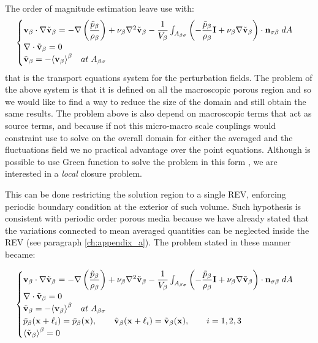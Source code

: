 The order of magnitude estimation leave use with:
\begin{eqnarray}
	\begin{cases}
		\textbf{v}_{\beta} \cdot \nabla \tilde{\textbf{v}}_{\beta} = -\nabla \left(\dfrac{\tilde{p}_{\beta}}{\rho_{\beta}}\right) + \nu_{\beta} \nabla^2 \tilde{\textbf{v}}_{\beta} - \dfrac{1}{V_\beta} \int_{A_{\beta \sigma}} \left(-\dfrac{\tilde{p}_{\beta}}{\rho_{\beta}} \mathbf{I}  + \nu_{\beta} \nabla \tilde{\textbf{v}}_{\beta} \right) \cdot \mathbf{n}_{\sigma \beta} \;dA  \\
		\nabla \cdot \tilde{\textbf{v}}_{\beta} = 0  \\
		\tilde{\textbf{v}}_{\beta} = -{\left< \textbf{v}_{\beta} \right>}^{\beta} \quad at \; A_{\beta \sigma}
	\end{cases}
\label{eq:vans_mom_}
\end{eqnarray}
that is the transport equations system for the perturbation fields.
The problem of the above system is that it is defined on all the macroscopic porous region and so we would like to find a way to reduce the size of the domain and still obtain the same results.
The problem above is also depend on macroscopic terms that act as source terms, and because if not this micro-macro scale couplings would constraint use to solve on the overall domain for either the averaged and the fluctuations field we no practical advantage over the point equations.
Although is possible to use Green function to solve the problem in this form \citet{wood2013volume}, we are interested in a \textit{local} closure problem.

This can be done restricting the solution region to a single REV, enforcing periodic boundary condition at the exterior of such volume.
Such hypothesis is consistent with periodic order porous media because we have already stated that the variations connected to mean averaged quantities can be neglected inside the REV (see paragraph \ref{ch:appendix_a}).
The problem stated in these manner became:

\begin{eqnarray}
\begin{cases}
\textbf{v}_{\beta} \cdot \nabla \tilde{\textbf{v}}_{\beta} = -\nabla \left(\dfrac{\tilde{p}_{\beta}}{\rho_{\beta}}\right) + \nu_{\beta} \nabla^2 \tilde{\textbf{v}}_{\beta} - \dfrac{1}{V_\beta} \int_{A_{\beta \sigma}} \left(-\dfrac{\tilde{p}_{\beta}}{\rho_{\beta}} \mathbf{I}  + \nu_{\beta} \nabla \tilde{\textbf{v}}_{\beta} \right) \cdot \mathbf{n}_{\sigma \beta} \;dA  \\
\nabla \cdot \tilde{\textbf{v}}_{\beta} = 0  \\
\tilde{\textbf{v}}_{\beta} = -{\left< \textbf{v}_{\beta} \right>}^{\beta} \quad at \; A_{\beta \sigma} \\
\tilde{p}_{\beta}(\mathbf{x} +\ell_i) = \tilde{p}_{\beta}(\mathbf{x}), \qquad \tilde{\textbf{v}}_{\beta}(\mathbf{x} +\ell_i) = \tilde{\textbf{v}}_{\beta}(\mathbf{x}), \qquad i=1,2,3 \\
{\left< \tilde{\textbf{v}}_{\beta} \right>}^{\beta} = 0
\end{cases}
\label{eq:vans_mom_2}
\end{eqnarray}

